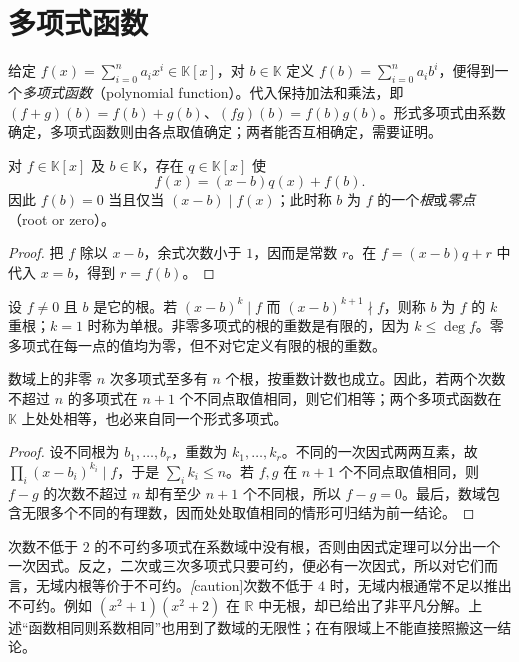 \section{多项式函数}
\label{sec:polynomial-functions}

给定 $f(x)=\sum_{i=0}^n a_ix^i\in\mathbb K[x]$，对 $b\in\mathbb K$ 定义 $f(b)=\sum_{i=0}^n a_ib^i$，便得到一个\emph{多项式函数}（polynomial function）。代入保持加法和乘法，即 $(f+g)(b)=f(b)+g(b)$、$(fg)(b)=f(b)g(b)$。形式多项式由系数确定，多项式函数则由各点取值确定；两者能否互相确定，需要证明。

\begin{theorem}[余数定理与因式定理]
\label{thm:polynomial-remainder}
对 $f\in\mathbb K[x]$ 及 $b\in\mathbb K$，存在 $q\in\mathbb K[x]$ 使
\[
    f(x)=(x-b)q(x)+f(b).
\]
因此 $f(b)=0$ 当且仅当 $(x-b)\mid f(x)$；此时称 $b$ 为 $f$ 的一个\emph{根}或\emph{零点}（root or zero）。
\end{theorem}
\begin{proof}
把 $f$ 除以 $x-b$，余式次数小于 $1$，因而是常数 $r$。在 $f=(x-b)q+r$ 中代入 $x=b$，得到 $r=f(b)$。
\end{proof}

\begin{definition}
设 $f\ne0$ 且 $b$ 是它的根。若 $(x-b)^k\mid f$ 而 $(x-b)^{k+1}\nmid f$，则称 $b$ 为 $f$ 的 $k$ 重根；$k=1$ 时称为单根。非零多项式的根的重数是有限的，因为 $k\leq\deg f$。零多项式在每一点的值均为零，但不对它定义有限的根的重数。
\end{definition}

\begin{theorem}
\label{thm:polynomial-root-bound}
数域上的非零 $n$ 次多项式至多有 $n$ 个根，按重数计数也成立。因此，若两个次数不超过 $n$ 的多项式在 $n+1$ 个不同点取值相同，则它们相等；两个多项式函数在 $\mathbb K$ 上处处相等，也必来自同一个形式多项式。
\end{theorem}
\begin{proof}
设不同根为 $b_1,\ldots,b_r$，重数为 $k_1,\ldots,k_r$。不同的一次因式两两互素，故 $\prod_i(x-b_i)^{k_i}\mid f$，于是 $\sum_i k_i\leq n$。若 $f,g$ 在 $n+1$ 个不同点取值相同，则 $f-g$ 的次数不超过 $n$ 却有至少 $n+1$ 个不同根，所以 $f-g=0$。最后，数域包含无限多个不同的有理数，因而处处取值相同的情形可归结为前一结论。
\end{proof}

次数不低于 $2$ 的不可约多项式在系数域中没有根，否则由因式定理可以分出一个一次因式。反之，二次或三次多项式只要可约，便必有一次因式，所以对它们而言，无域内根等价于不可约。\emph[caution]{次数不低于 $4$ 时，无域内根通常不足以推出不可约。}例如 $(x^2+1)(x^2+2)$ 在 $\mathbb R$ 中无根，却已给出了非平凡分解。上述“函数相同则系数相同”也用到了数域的无限性；在有限域上不能直接照搬这一结论。

